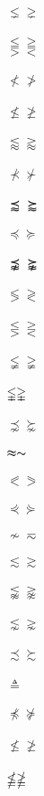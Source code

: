 \documentclass{article}
\begin{document}
$\lneq \gneq $\\\\
$\lesseqqgtr \gtreqqless $\\\\
$\nless \ngtr $\\\\
$\nleq \ngeq $\\\\
$\lessapprox \gtrapprox $\\\\
$\nprec \nsucc $\\\\
$\precapprox \succapprox $\\\\
$\preccurlyeq \succcurlyeq $\\\\
$\precnapprox \succnapprox $\\\\
$\lessgtr \gtrless $\\\\
$\lesseqgtr \gtreqless $\\\\
$\lneqq \gneqq $\\\\
$\lvertneqq \gvertneqq $\\\\
$\precnsim \succnsim $\\\\
$\thickapprox \thicksim$\\\\
$\eqslantless \eqslantgtr $\\\\
$\curlyeqprec \curlyeqsucc $\\\\
$\nsim \eqsim $\\\\
$\lesssim \gtrsim $\\\\
$\lnapprox \gnapprox $\\\\
$\lnsim \gnsim $\\\\
$\precsim \succsim $\\\\
$\triangleq $\\\\
$\npreceq \nsucceq $\\\\
$\nleqslant \ngeqslant $\\\\
$\nleqq \ngeqq $\\\\
\end{document}

